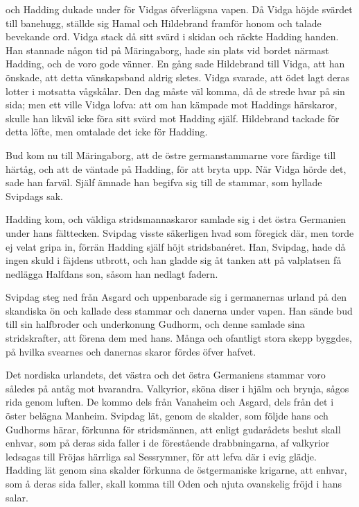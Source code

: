 och Hadding dukade under för Vidgas öfverlägsna vapen. Då Vidga höjde
svärdet till banehugg, ställde sig Hamal och Hildebrand framför honom
och talade bevekande ord. Vidga stack då sitt svärd i skidan och räckte
Hadding handen. Han stannade någon tid på Märingaborg, hade sin plats
vid bordet närmast Hadding, och de voro gode vänner. En gång sade
Hildebrand till Vidga, att han önskade, att detta vänskapsband aldrig
sletes. Vidga svarade, att ödet lagt deras lotter i motsatta vågskålar.
Den dag måste väl komma, då de strede hvar på sin sida; men ett ville
Vidga lofva: att om han kämpade mot Haddings härskaror, skulle han
likväl icke föra sitt svärd mot Hadding själf. Hildebrand tackade för
detta löfte, men omtalade det icke för Hadding.

Bud kom nu till Märingaborg, att de östre germanstammarne vore färdige
till härtåg, och att de väntade på Hadding, för att bryta upp. När Vidga
hörde det, sade han farväl. Själf ämnade han begifva sig till de
stammar, som hyllade Svipdags sak.

Hadding kom, och väldiga stridsmannaskaror samlade sig i det östra
Germanien under hans fälttecken. Svipdag visste säkerligen hvad som
föregick där, men torde ej velat gripa in, förrän Hadding själf höjt
stridsbanéret. Han, Svipdag, hade då ingen skuld i fäjdens utbrott, och
han gladde sig åt tanken att på valplatsen få nedlägga Halfdans son,
såsom han nedlagt fadern.

Svipdag steg ned från Asgard och uppenbarade sig i germanernas urland på
den skandiska ön och kallade dess stammar och danerna under vapen. Han
sände bud till sin halfbroder och underkonung Gudhorm, och denne samlade
sina stridskrafter, att förena dem med hans. Många och ofantligt stora
skepp byggdes, på hvilka svearnes och danernas skaror fördes öfver
hafvet.

Det nordiska urlandets, det västra och det östra Germaniens stammar voro
således på antåg mot hvarandra. Valkyrior, sköna diser i hjälm och
brynja, sågos rida genom luften. De kommo dels från Vanaheim och Asgard,
dels från
det i öster belägna Manheim. Svipdag lät, genom de skalder, som följde
hans och Gudhorms härar, förkunna för stridsmännen, att enligt
gudarådets beslut skall enhvar, som på deras sida faller i de
förestående drabbningarna, af valkyrior ledsagas till Fröjas härrliga
sal Sessrymner, för att lefva där i evig glädje. Hadding lät genom sina
skalder förkunna de östgermaniske krigarne, att enhvar, som å deras sida
faller, skall komma till Oden och njuta ovanskelig fröjd i hans salar.

